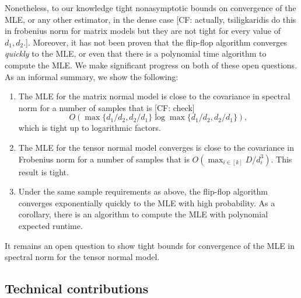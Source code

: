 \documentclass{article}
\newcommand{\CF}[1]{{\color{purple}[CF: #1]}}
\begin{document}
Nonetheless, to our knowledge tight nonasymptotic bounds on convergence of the MLE, or any other estimator, in the dense case \CF{actually, tsiligkaridis do this in frobenius norm for matrix models but they are not tight for every value of $d_1, d_2$.}. Moreover, it has not been proven that the flip-flop algorithm converges \emph{quickly} to the MLE, or even that there is a polynomial time algorithm to compute the MLE. We make significant progress on both of these open questions. As an informal summary, we show the following:
\begin{enumerate}
\item The MLE for the matrix normal model is close to the covariance in spectral norm for a number of samples that is \CF{check}
$$O(\max \{d_1/d_2, d_2/d_1\} \log \max \{d_1/d_2, d_2/d_1\}),$$ which is tight up to logarithmic factors.
\item The MLE for the tensor normal model converges is close to the covariance in Frobenius norm for a number of samples that is $O(\max_{i \in [k]} D/d_i^3)$. This result is tight.
\item Under the same sample requirements as above, the flip-flop algorithm converges exponentially quickly to the MLE with high probability. As a corollary, there is an algorithm to compute the  MLE with polynomial expected runtime.
\end{enumerate}
It remains an open question to show tight bounds for convergence of the MLE in spectral norm for the tensor normal model.

\subsection{Technical contributions}
\end{document}
